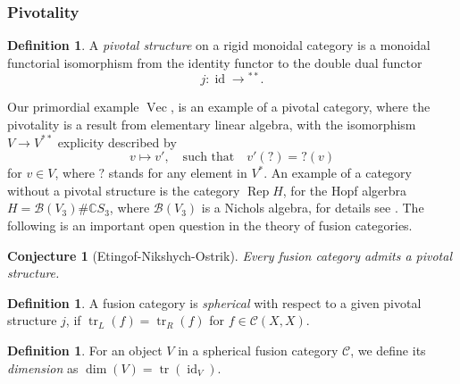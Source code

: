 \documentclass[a4paper, 10pt]{book}
\newtheorem{Conj}[theorem]{Conjecture}
\theoremstyle{definition}
\newtheorem{Def}[theorem]{Definition}
\numberwithin{equation}{chapter}
\newcommand\tr{\operatorname{tr}}
\newcommand\id{\operatorname{id}}
\newcommand\Rep{\operatorname{Rep}}
\newcommand\Vect{\operatorname{Vec}}
\newcommand\kk{\mathbb C}
\newcommand\C{\mathcal C}
\begin{document}
\subsubsection{Pivotality}
\begin{Def}
	A \textit{pivotal structure} on a rigid monoidal category is a monoidal functorial isomorphism from the identity functor to the double dual functor \begin{equation*}
	j:  \id\rightarrow {}^{**} .
\end{equation*}

\end{Def}Our primordial example $\Vect$, is an example of a pivotal category, where the pivotality is a result from elementary linear algebra, with the isomorphism $V\rightarrow V^{**}$ explicity described by \begin{equation*}
	v\mapsto v' ,\quad  \text{such that} \quad v'(?) = ?(v)
\end{equation*}  for $v\in V$, where $?$ stands for any element in $V^*$. An example of a category without a pivotal structure is the category $\Rep H$, for the Hopf algerbra $H = \mathcal{B}(V_3) \# \kk S_3$, where $\mathcal{B}(V_3)$ is a Nichols algebra, for details see \cite[Remark 2.11]{MR3585364}.
The following is an important open question in the theory of fusion categories. \begin{Conj}[Etingof-Nikshych-Ostrik]
Every fusion category admits a pivotal structure.
\end{Conj}


\begin{Def}
A fusion category is \textit{spherical} with respect to a given pivotal structure $j$, if $\tr_L(f) = \tr_R(f)$ for $f \in \C(X, X)$.
\end{Def}
\begin{Def}
For an object $V$ in a spherical fusion category $\C$, we define its \textit{dimension} as $\dim (V) = \tr(\id_V)$.
\end{Def}
\end{document}
